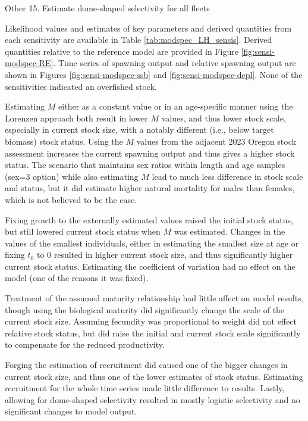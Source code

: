 \documentclass[11pt,
  english,
  letterpaper,
]{article}
\begin{document}
Other 15. Estimate dome-shaped selectivity for all fleets

Likelihood values and estimates of key parameters and derived quantities from each sensitivity are available in Table \ref{tab:modspec_LH_sensis}. Derived quantities relative to the reference model are provided in Figure \ref{fig:sensi-modspec-RE}. Time series of spawning output and relative spawning output are shown in Figures \ref{fig:sensi-modspec-ssb} and \ref{fig:sensi-modspec-depl}. None of the sensitivities indicated an overfished stock.

Estimating \(M\) either as a constant value or in an age-specific manner using the Lorenzen approach both result in lower \(M\) values, and thus lower stock scale, especially in current stock size, with a notably different (i.e., below target biomass) stock status. Using the \(M\) values from the adjacent 2023 Oregon stock assessment increases the current spawning output and thus gives a higher stock status. The scenario that maintains sex ratios within length and age samples (sex=3 option) while also estimating \(M\) lead to much less difference in stock scale and status, but it did estimate higher natural mortality for males than females, which is not believed to be the case.

Fixing growth to the externally estimated values raised the initial stock status, but still lowered current stock status when \(M\) was estimated. Changes in the values of the smallest individuals, either in estimating the smallest size at age or fixing \(t_0\) to 0 resulted in higher current stock size, and thus significantly higher current stock status. Estimating the coefficient of variation had no effect on the model (one of the reasons it was fixed).

Treatment of the assumed maturity relationship had little affect on model results, though using the biological maturity did significantly change the scale of the current stock size. Assuming fecundity was proportional to weight did not effect relative stock status, but did raise the initial and current stock scale significantly to compensate for the reduced productivity.

Forging the estimation of recruitment did caused one of the bigger changes in current stock size, and thus one of the lower estimates of stock status. Estimating recruitment for the whole time series made little difference to results. Lastly, allowing for dome-shaped selectivity resulted in mostly logistic selectivity and no significant changes to model output.
\end{document}
